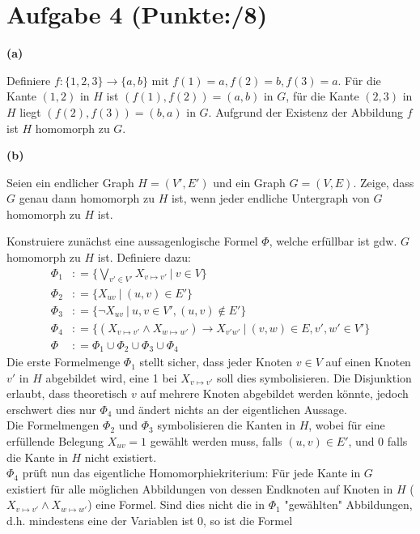 \documentclass[11pt, a4paper]{article}
\newcommand{\ppp}{8}
\newcommand{\defgr}{\mathrel{\mathop:\!\!=}}
\begin{document}
\section*{Aufgabe 4 (Punkte:\qquad/\ppp)}
\textbf{(a)}
\begin{adjustwidth}{20pt}{20pt}
Definiere $f:\{ 1,2,3\} \to \{ a,b\}$ mit $f(1)=a, f(2)=b, f(3)=a$. Für die Kante $(1,2)$ in $H$ ist $(f(1),f(2))=(a,b)$ in $G$, für die Kante $(2,3)$ in $H$ liegt $(f(2),f(3))=(b,a)$ in $G$.
Aufgrund der Existenz der Abbildung $f$ ist $H$ homomorph zu $G$.
\end{adjustwidth}
\textbf{(b)}
\begin{adjustwidth}{20pt}{20pt}
Seien ein endlicher Graph $H=(V', E')$ und ein Graph $G=(V,E)$. Zeige, dass $G$ genau dann homomorph zu $H$ ist, wenn jeder endliche Untergraph von $G$ homomorph zu $H$ ist. \par
Konstruiere zunächst eine aussagenlogische Formel $\Phi$, welche erfüllbar ist gdw. $G$ homomorph zu $H$ ist. Definiere dazu:
\begin{align*}
	\Phi_1 & \defgr \{ \bigvee_{v'\in V'} X_{v\mapsto v'}\ |\ v\in V \}\\
	\Phi_2 & \defgr \{ X_{uv}\ |\ (u,v)\in E'\}\\
	\Phi_3 & \defgr \{ \neg X_{uv}\ |\ u,v\in V', (u,v)\notin E'\}\\
	\Phi_4 & \defgr \{ (X_{v\mapsto v'} \wedge X_{w\mapsto w'}) \rightarrow X_{v'w'}\ |\ (v,w) \in E, v', w' \in V'\}\\
	\Phi     & \defgr \Phi_1 \cup \Phi_2 \cup \Phi_3 \cup \Phi_4
\end{align*}
Die erste Formelmenge $\Phi_1$ stellt sicher, dass jeder Knoten $v \in V$ auf einen Knoten $v'$ in $H$ abgebildet wird, eine 1 bei $X_{v\mapsto v'}$ soll dies symbolisieren.
Die Disjunktion erlaubt, dass theoretisch $v$ auf mehrere Knoten abgebildet werden könnte, jedoch erschwert dies nur $\Phi_4$ und ändert nichts an der eigentlichen Aussage.\\
Die Formelmengen $\Phi_2$ und $\Phi_3$ symbolisieren die Kanten in $H$, wobei für eine erfüllende Belegung $X_{uv}=1$ gewählt werden muss, falls $(u,v)\in E'$, und 0 falls
die Kante in $H$ nicht existiert.\\
$\Phi_4$ prüft nun das eigentliche Homomorphiekriterium: Für jede Kante in $G$ existiert für alle möglichen Abbildungen von dessen Endknoten auf Knoten in $H$
($X_{v\mapsto v'} \wedge X_{w\mapsto w'}$) eine Formel. Sind dies nicht die in $\Phi_1$ "gewählten" Abbildungen, d.h. mindestens eine der Variablen ist 0, so ist die Formel

\end{adjustwidth}
\end{document}
